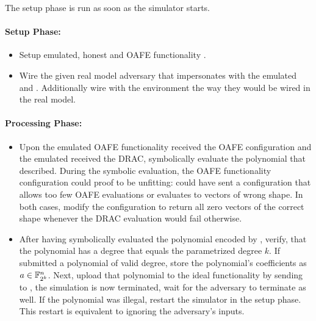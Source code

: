 \label{sec:simulator-goliath}

The setup phase is run as soon as the simulator starts.

\paragraph{Setup Phase:}

\begin{itemize}

  \item Setup emulated, honest \JWpTwo{} and OAFE functionality
    \JWfuncSymOAFE{}.

  \item Wire the given real model adversary \JWadv{} that impersonates \JWpOne{}
    with the emulated \JWpTwo{} and \JWfuncSymOAFE{}. Additionally wire \JWadv{}
    with the environment the way they would be wired in the real model.

\end{itemize}

\paragraph{Processing Phase:}

\begin{itemize}

  \item Upon the emulated OAFE functionality received the OAFE configuration and
    the emulated \JWpTwo{} received the DRAC, symbolically evaluate the
    polynomial that \JWadv{} described. During the symbolic evaluation, the OAFE
    functionality configuration could proof to be unfitting: \JWadv{} could
    have sent a configuration that allows too few OAFE evaluations or evaluates
    to vectors of wrong shape. In both cases, modify the configuration to return
    all zero vectors of the correct shape whenever the DRAC evaluation would
    fail otherwise.

  \item After having symbolically evaluated the polynomial encoded by \JWadv{},
    verify, that the polynomial has a degree that equals the parametrized degree
    $k$. If \JWadv{} submitted a polynomial of valid degree, store the
    polynomial's coefficients as $a \in \mathbb{F}_{2^k}^n$.  Next, upload that
    polynomial to the ideal functionality \JWfuncSymOPEnp{} by sending
     to \JWfuncSymOPEnp{}, the simulation is now
    terminated, wait for the adversary to terminate as well. If the polynomial
    was illegal, restart the simulator in the setup phase.  This restart is
    equivalent to ignoring the adversary's inputs.

\end{itemize}


